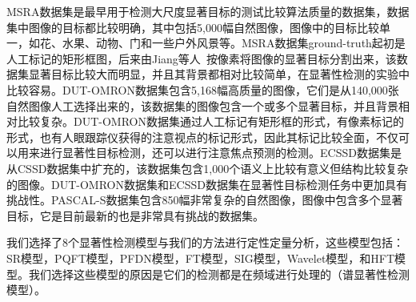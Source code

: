 MSRA数据集是最早用于检测大尺度显著目标的测试比较算法质量的数据集，数据集中图像的目标都比较明确，其中包括5,000幅自然图像，图像中的目标比较单一，如花、水果、动物、门和一些户外风景等。MSRA数据集ground-truth起初是人工标记的矩形框图，后来由Jiang等人~\cite{JiangHuaizuCVPR2013Discriminative}按像素将图像的显著目标分割出来，该数据集显著目标比较大而明显，并且其背景都相对比较简单，在显著性检测的实验中比较容易。DUT-OMRON数据集\cite{YangChuanCVPR2013Manifold}包含5,168幅高质量的图像，它们是从140,000张自然图像人工选择出来的，该数据集的图像包含一个或多个显著目标，并且背景相对比较复杂。DUT-OMRON数据集\cite{YangChuanCVPR2013Manifold}通过人工标记有矩形框的形式，有像素标记的形式，也有人眼跟踪仪获得的注意视点的标记形式，因此其标记比较全面，不仅可以用来进行显著性目标检测，还可以进行注意焦点预测的检测。ECSSD数据集\cite{YanQiongCVPR2013Hierarchical}是从CSSD数据集中扩充的，该数据集包含1,000个语义上比较有意义但结构比较复杂的图像。DUT-OMRON数据集\cite{YangChuanCVPR2013Manifold}和ECSSD数据集\cite{YanQiongCVPR2013Hierarchical}在显著性目标检测任务中更加具有挑战性。PASCAL-S数据集\cite{LiYinCVPR2014Secrets}包含850幅非常复杂的自然图像，图像中包含多个显著目标，它是目前最新的也是非常具有挑战的数据集。

我们选择了8个显著性检测模型与我们的方法进行定性定量分析，这些模型包括：SR模型\cite{HouXiaodiCVPR2007Residual}，PQFT模型\cite{GuoChenleiCVPR2008Spatio}，PFDN模型\cite{BianCognNeurodyn2010Visual}，FT模型\cite{AchantaCVPR2009Frequency}，SIG模型\cite{HouXiaodiTPAMI2012Signature}，Wavelet模型\cite{ImamogluTMM2013wavelet}，和HFT模型\cite{LiJianTPAMI2013Scale}。我们选择这些模型的原因是它们的检测都是在频域进行处理的（谱显著性检测模型）。

